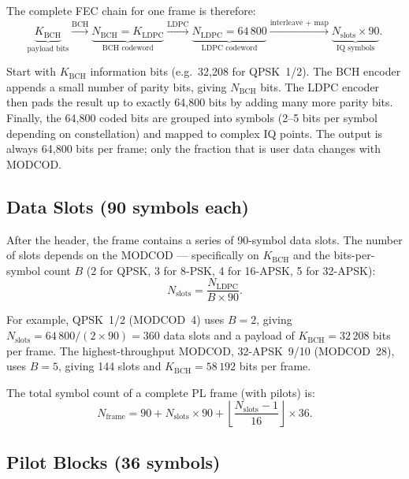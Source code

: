 \documentclass[12pt,a4paper]{report}
\begin{document}
\noindent
The complete FEC chain for one frame is therefore:
\begin{equation}
    \underbrace{K_\text{BCH}}_{\text{payload bits}}
    \xrightarrow{\text{BCH}}
    \underbrace{N_\text{BCH} = K_\text{LDPC}}_{\text{BCH codeword}}
    \xrightarrow{\text{LDPC}}
    \underbrace{N_\text{LDPC} = 64\,800}_{\text{LDPC codeword}}
    \xrightarrow{\text{interleave + map}}
    \underbrace{N_\text{slots}\times 90}_{\text{IQ symbols}}.
\end{equation}
\begin{plainenglish}
Start with $K_\text{BCH}$ information bits (e.g.\ 32,208 for QPSK~1/2).
The BCH encoder appends a small number of parity bits, giving $N_\text{BCH}$
bits.  The LDPC encoder then pads the result up to exactly 64,800 bits by
adding many more parity bits.  Finally, the 64,800 coded bits are grouped into
symbols (2--5 bits per symbol depending on constellation) and mapped to
complex IQ points.  The output is always 64,800 bits per frame; only the
fraction that is user data changes with MODCOD.
\end{plainenglish}

\subsection{Data Slots (90 symbols each)}

After the header, the frame contains a series of 90-symbol data slots. The
number of slots depends on the MODCOD --- specifically on $K_\text{BCH}$ and
the bits-per-symbol count $B$ (2 for QPSK, 3 for 8-PSK, 4 for 16-APSK, 5 for
32-APSK):
\begin{equation}
    N_\text{slots} = \frac{N_\text{LDPC}}{B \times 90}.
\end{equation}

\noindent
For example, QPSK~1/2 (MODCOD~4) uses $B=2$, giving
$N_\text{slots} = 64\,800 / (2\times90) = 360$ data slots and a payload of
$K_\text{BCH} = 32\,208$ bits per frame.  The highest-throughput MODCOD,
32-APSK~9/10 (MODCOD~28), uses $B=5$, giving 144 slots and
$K_\text{BCH} = 58\,192$ bits per frame.

The total symbol count of a complete PL frame (with pilots) is:
\begin{equation}
    N_\text{frame} = 90 + N_\text{slots}\times 90
    + \left\lfloor\frac{N_\text{slots}-1}{16}\right\rfloor \times 36.
\end{equation}

\subsection{Pilot Blocks (36 symbols)}
\end{document}

